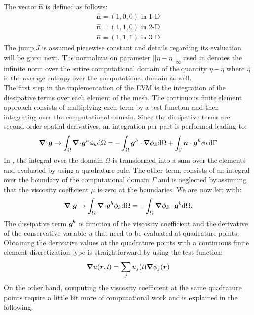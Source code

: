%
The vector $\boldsymbol{\hat{n}}$ is defined as follows:
\begin{eqnarray}\label{eq:bg_hat_sect2}
\boldsymbol{\hat{n}} = \left( 1, 0, 0 \right) \text{ in 1-D} \nonumber \\
\boldsymbol{\hat{n}} = \left( 1, 1, 0 \right) \text{ in 2-D} \nonumber \\
\boldsymbol{\hat{n}} = \left( 1, 1, 1 \right) \text{ in 3-D} \nonumber
\end{eqnarray}
The jump $J$ is assumed piecewise constant and details regarding its evaluation will be given next. The normalization parameter $|| \eta - \bar{\eta} ||_\infty$ used in  denotes the infinite norm over the entire computational domain of the quantity $\eta - \bar{\eta}$ where $\bar{\eta}$ is the average entropy over the computational domain as well.\\
The first step in the implementation of the EVM is the integration of the dissipative terms over each element of the mesh. The continuous finite element approach consists of multiplying each term by a test function and then integrating over the computational domain. Since the dissipative terms are second-order spatial derivatives, an integration per part is performed leading to:
%
\begin{equation}\label{eq:diss_term_sct2}
\boldsymbol{\nabla}\! \cdot \! \boldsymbol g \rightarrow \int_\Omega \boldsymbol{\nabla}\! \cdot \! \boldsymbol g^h \phi_k \text{d}\Omega  = -\int_\Omega \boldsymbol g^h \cdot \boldsymbol{\nabla} \phi_k \text{d}\Omega + \int_\Gamma \boldsymbol n \cdot \boldsymbol g^h \phi_k \text{d}\Gamma
\end{equation} 
%
In , the integral over the domain $\Omega$ is transformed into a sum over the elements and evaluated by using a quadrature rule. The other term, consists of an integral over the boundary of the computational domain $\Gamma$ and is neglected by assuming that the viscosity coefficient $\mu$ is zero at the boundaries. We are now left with:
\begin{equation}\label{eq:diss_term2_sct2}
\boldsymbol{\nabla}\! \cdot \! \boldsymbol g \rightarrow \int_\Omega \boldsymbol{\nabla}\! \cdot \! \boldsymbol g^h \phi_k \text{d}\Omega  = -\int_\Omega \boldsymbol{\nabla} \phi_k \cdot \boldsymbol g^h\text{d}\Omega.
\end{equation} 
%
The dissipative term $\boldsymbol g^h$ is function of the viscosity coefficient and the derivative of the conservative variable $u$ that need to be evaluated at quadrature points. Obtaining the derivative values at the quadrature points with a continuous finite element discretization type is straightforward by using the test function: 
%
\begin{equation}
\boldsymbol{\nabla} u(\boldsymbol r,t) = \sum_j u_j(t) \boldsymbol{\nabla} \phi_j(\boldsymbol r)
\end{equation}
%
On the other hand, computing the viscosity coefficient at the same quadrature points require a little bit more of computational work and is explained in the following. \\

